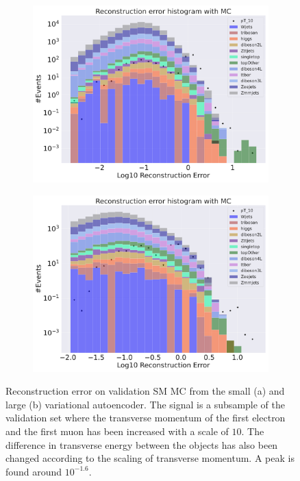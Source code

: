 \begin{figure}[H]
    \centering
    \begin{subfigure}{.45\textwidth}
        \includegraphics[width=\textwidth]{Figures/VAE_testing/small/b_data_recon_big_rm3_feats_sig_pT_10.pdf}
        \caption{ }
        \label{fig:VAE_small_pt_10}
    \end{subfigure}
    \hfill 
    \begin{subfigure}{.45\textwidth}
        \includegraphics[width=\textwidth]{Figures/VAE_testing/big/b_data_recon_big_rm3_feats_sig_pT_10.pdf}
        \caption{}
        \label{fig:VAE_big_pt_10}
    \end{subfigure}
    \hfill 
    \caption[VAE | Reconstruction error $p_T$ altering of 10]{Reconstruction error on validation SM MC from the small (a) and large (b) variational autoencoder. The signal is a subsample of the validation 
    set where the transverse momentum of the first electron and the first muon has been increased with a scale of $10$. The difference in transverse energy between the objects has also been changed according to the scaling of transverse momentum. 
    A peak is found around $10^{-1.6}$.}
    \label{fig:VAE_big_small_pt_10}
\end{figure}

